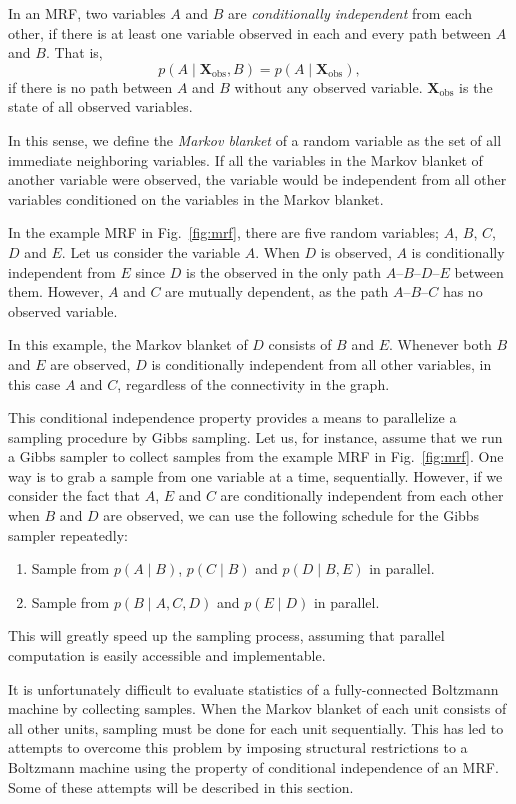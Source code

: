 \documentclass{now}
\newcommand{\matr}[1]{\mathbf{#1}}
\newcommand{\mX}[0]{\matr{X}}
\begin{document}
In an MRF, two variables $A$ and $B$ are
\textit{conditionally independent} from each other, if there
is at least one variable observed in each and every path
between $A$ and $B$.
That is, 
\[
p(A \mid \mX_{\text{obs}}, B) = p(A \mid \mX_{\text{obs}}),
\]
if there is no path between $A$ and $B$ without any observed
variable. $\mX_{\text{obs}}$ is the state of all observed
variables.

In this sense, we define the \textit{Markov blanket} of a
random variable as the set of all immediate neighboring
variables. If all the variables in the Markov blanket of another
variable were observed, the variable would be independent from all
other variables conditioned on the variables in the Markov
blanket.

In the example MRF in Fig.~\ref{fig:mrf}, there are five
random variables; $A$, $B$, $C$, $D$ and $E$. Let us
consider the variable $A$. When $D$ is observed, $A$ is
conditionally independent from $E$ since $D$ is the observed
in the only path $A$--$B$--$D$--$E$ between them. However,
$A$ and $C$ are mutually dependent, as the path
$A$--$B$--$C$ has no observed variable.

In this example, the Markov blanket of $D$ consists of $B$ and
$E$. Whenever both $B$ and $E$ are observed, $D$ is
conditionally independent from all other variables, in this
case $A$ and $C$, regardless of the connectivity in the
graph.

This conditional independence property provides a means to
parallelize a sampling procedure by Gibbs sampling. Let
us, for instance, assume that we run a Gibbs sampler to
collect samples from the example MRF in Fig.~\ref{fig:mrf}. One way is to grab a
sample from one variable at a time, sequentially. However,
if we consider the fact that $A$, $E$ and $C$ are
conditionally independent from each other when $B$ and $D$
are observed, we can use the following schedule for the
Gibbs sampler repeatedly:
\begin{enumerate}
    \itemsep 0em
    \item Sample from $p(A\mid B)$, $p(C \mid B)$ and $p(D
        \mid B, E)$ in parallel.
    \item Sample from $p(B \mid A, C, D)$ and $p(E \mid D)$
        in parallel.
\end{enumerate}
This will greatly speed up the sampling process, assuming
that parallel computation is easily accessible and
implementable.

It is unfortunately difficult to evaluate
statistics of a fully-connected Boltzmann machine by
collecting samples. When the Markov blanket of each unit
consists of all other units, sampling must be done for each
unit sequentially. This has led to attempts to overcome this
problem by imposing structural restrictions to a Boltzmann
machine using the property of conditional independence of an
MRF. Some of these attempts will be described in this section.
\end{document}
